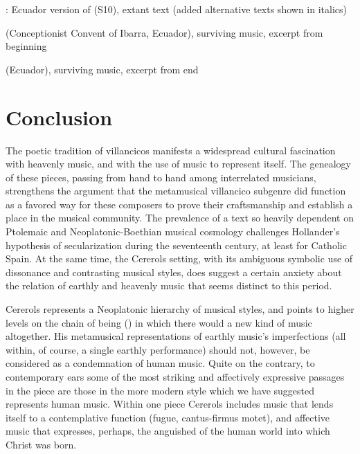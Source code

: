 {: Ecuador version of 
(S10), extant text (added alternative texts shown in italics)}

{ (Conceptionist Convent of Ibarra, Ecuador),
surviving music, excerpt from beginning}

{ (Ecuador), surviving music, excerpt from end}


\section{Conclusion}

The poetic tradition of  villancicos manifests a
widespread cultural fascination with heavenly music, and with the use of music
to represent itself.
The genealogy of these pieces, passing from hand to hand among interrelated
musicians, strengthens the argument that the metamusical villancico subgenre did
function as a favored way for these composers to prove their craftsmanship and
establish a place in the musical community.
The prevalence of a text so heavily dependent on Ptolemaic and
Neoplatonic-Boethian musical cosmology challenges Hollander's hypothesis of
secularization during the seventeenth century, at least for Catholic Spain.
At the same time, the Cererols setting, with its ambiguous symbolic use of
dissonance and contrasting musical styles, does suggest a certain anxiety about
the relation of earthly and heavenly music that seems distinct to this period.

Cererols represents a Neoplatonic hierarchy of musical styles, and points to
higher levels on the chain of being () in which there
would a new kind of music altogether.
His metamusical representations of earthly music's imperfections (all within, of
course, a single earthly performance) should not, however, be considered as a
condemnation of human music.
Quite on the contrary, to contemporary ears some of the most striking and
affectively expressive passages in the piece are those in the more modern
style which we have suggested represents human music.  
Within one piece Cererols includes music that lends itself to a contemplative
function (fugue, cantus-firmus motet), and affective music that expresses,
perhaps, the anguished  of the human world into which Christ was
born.

